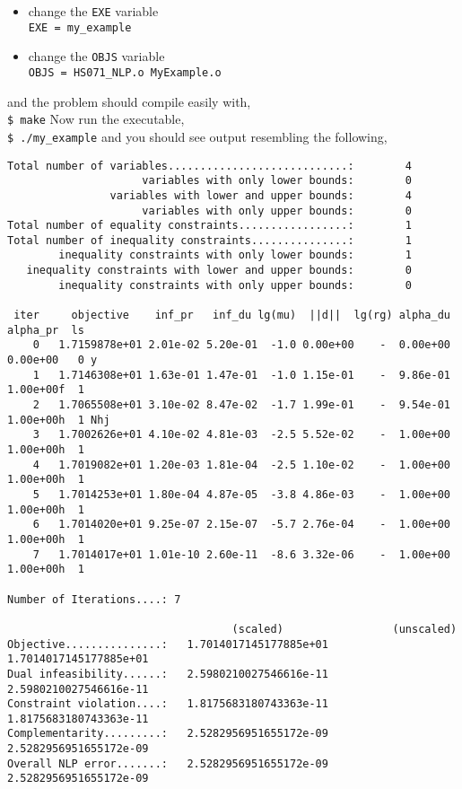 \documentclass[letter,10pt]{article}
\begin{document}
{\begin{itemize}
\item change the {\tt EXE} variable \\
{\tt EXE = my\_example}
\item change the {\tt OBJS} variable \\
{\tt OBJS = HS071\_NLP.o MyExample.o}
\end{itemize}
and the problem should compile easily with, \\
{\tt \$ make}
Now run the executable,\\ 
{\tt \$ ./my\_example}
and you should see output resembling the following,
\begin{verbatim}
Total number of variables............................:        4
                     variables with only lower bounds:        0
                variables with lower and upper bounds:        4
                     variables with only upper bounds:        0
Total number of equality constraints.................:        1
Total number of inequality constraints...............:        1
        inequality constraints with only lower bounds:        1
   inequality constraints with lower and upper bounds:        0
        inequality constraints with only upper bounds:        0
 
 iter     objective    inf_pr   inf_du lg(mu)  ||d||  lg(rg) alpha_du alpha_pr  ls
    0   1.7159878e+01 2.01e-02 5.20e-01  -1.0 0.00e+00    -  0.00e+00 0.00e+00   0 y
    1   1.7146308e+01 1.63e-01 1.47e-01  -1.0 1.15e-01    -  9.86e-01 1.00e+00f  1
    2   1.7065508e+01 3.10e-02 8.47e-02  -1.7 1.99e-01    -  9.54e-01 1.00e+00h  1 Nhj
    3   1.7002626e+01 4.10e-02 4.81e-03  -2.5 5.52e-02    -  1.00e+00 1.00e+00h  1
    4   1.7019082e+01 1.20e-03 1.81e-04  -2.5 1.10e-02    -  1.00e+00 1.00e+00h  1
    5   1.7014253e+01 1.80e-04 4.87e-05  -3.8 4.86e-03    -  1.00e+00 1.00e+00h  1
    6   1.7014020e+01 9.25e-07 2.15e-07  -5.7 2.76e-04    -  1.00e+00 1.00e+00h  1
    7   1.7014017e+01 1.01e-10 2.60e-11  -8.6 3.32e-06    -  1.00e+00 1.00e+00h  1
 
Number of Iterations....: 7
 
                                   (scaled)                 (unscaled)
Objective...............:   1.7014017145177885e+01    1.7014017145177885e+01
Dual infeasibility......:   2.5980210027546616e-11    2.5980210027546616e-11
Constraint violation....:   1.8175683180743363e-11    1.8175683180743363e-11
Complementarity.........:   2.5282956951655172e-09    2.5282956951655172e-09
Overall NLP error.......:   2.5282956951655172e-09    2.5282956951655172e-09
 

\end{verbatim}}
\end{document}
